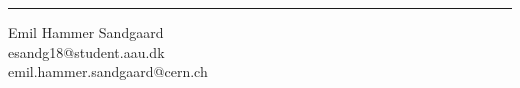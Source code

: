 



\vfill\noindent



\vspace{3\baselineskip}
\begin{center}
\begin{minipage}[b]{0.5\textwidth}
\vspace{15cm}
 \centering
 \rule{\textwidth}{0.9pt}
  Emil Hammer Sandgaard\\
 {\footnotesize esandg18@student.aau.dk}\\
 {\footnotesize emil.hammer.sandgaard@cern.ch}
\end{minipage}
\end{center}
